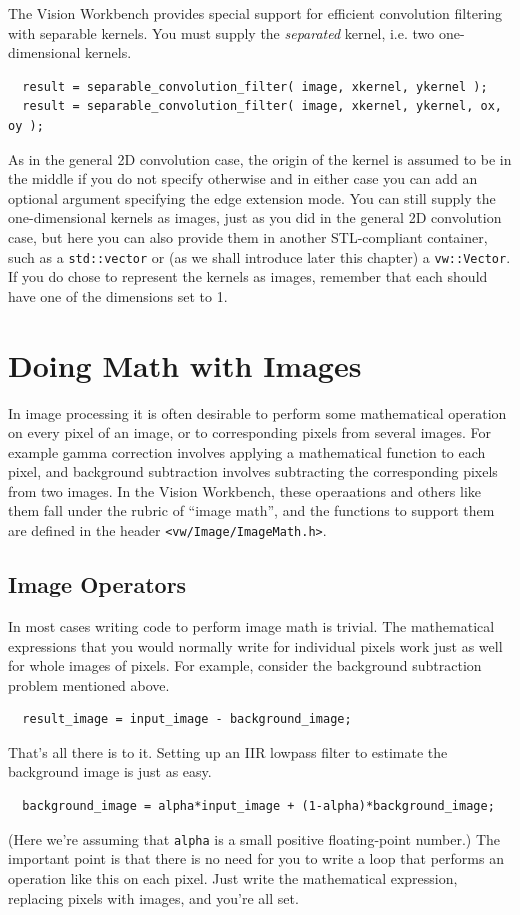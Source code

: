 The Vision Workbench provides special support for efficient 
convolution filtering with separable kernels.  You must supply the 
{\it separated} kernel, i.e. two one-dimensional kernels.
\begin{verbatim}
  result = separable_convolution_filter( image, xkernel, ykernel );
  result = separable_convolution_filter( image, xkernel, ykernel, ox, oy );
\end{verbatim}
As in the general 2D convolution case, the origin of the kernel is 
assumed to be in the middle if you do not specify otherwise and in 
either case you can add an optional argument specifying the edge 
extension mode.  You can still supply the one-dimensional kernels as 
images, just as you did in the general 2D convolution case, but here 
you can also provide them in another STL-compliant container, such 
as a \verb#std::vector# or (as we shall introduce later this chapter) 
a \verb#vw::Vector#.  If you do chose to represent the kernels as 
images, remember that each should have one of the dimensions set to 1.

\section{Doing Math with Images}

In image processing it is often desirable to perform some mathematical 
operation on every pixel of an image, or to corresponding pixels from 
several images.  For example gamma correction involves applying a 
mathematical function to each pixel, and background subtraction involves
subtracting the corresponding pixels from two images.  In the Vision 
Workbench, these operaations and others like them fall under the rubric 
of ``image math'', and the functions to support them are defined in the 
header \verb#<vw/Image/ImageMath.h>#.

\subsection{Image Operators}

In most cases writing code to perform image math is trivial.  The 
mathematical expressions that you would normally write for individual 
pixels work just as well for whole images of pixels.  For example, 
consider the background subtraction problem mentioned above.
\begin{verbatim}
  result_image = input_image - background_image;
\end{verbatim}
That's all there is to it.  Setting up an IIR lowpass filter to 
estimate the background image is just as easy.
\begin{verbatim}
  background_image = alpha*input_image + (1-alpha)*background_image;
\end{verbatim}
(Here we're assuming that \verb#alpha# is a small positive
floating-point number.)  The important point is that there is no need
for you to write a loop that performs an operation like this on each
pixel.  Just write the mathematical expression, replacing pixels with
images, and you're all set.

